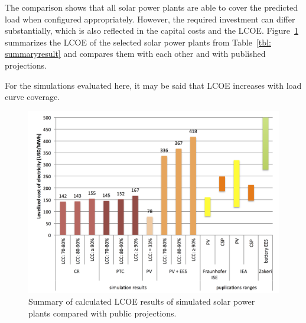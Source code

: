 The comparison shows that all solar power plants are able to cover the predicted load when configured appropriately. However, the required investment can differ substantially, which is also reflected in the capital costs and the \ac{LCOE}. Figure~\ref{LCOEcomparision} summarizes the \ac{LCOE} of the selected solar power plants from Table~\ref{tbl: summaryresult} and compares them with each other and with published projections.


For the simulations evaluated here, it may be said that \ac{LCOE} increases with load curve coverage.

\begin{figure}[htbp]  
\centering
\includegraphics[width=1\linewidth]{FIG/LCOEcomparision}
\caption{Summary of calculated LCOE results of simulated solar power plants compared with public projections.}\label{LCOEcomparision}
\end{figure}

